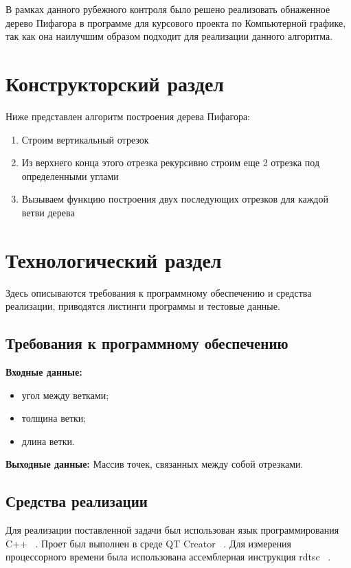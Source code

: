 \documentclass[a4paper,12pt]{article}
\begin{document}
	В рамках данного рубежного контроля было решено реализовать обнаженное дерево Пифагора в программе для курсового проекта по Компьютерной графике, так как она наилучшим образом подходит для реализации данного алгоритма.
	
	\section{Конструкторский раздел}
	
	Ниже представлен алгоритм построения дерева Пифагора:
	
	\begin{enumerate}
		\item Строим вертикальный отрезок
		\item Из верхнего конца этого отрезка рекурсивно строим еще 2 отрезка под определенными углами
		\item Вызываем функцию построения двух последующих отрезков для каждой ветви дерева
	\end{enumerate}
	
	\section{Технологический раздел}
	
	Здесь описываются требования к программному 
	обеспечению и средства реализации, приводятся листинги 
	программы и тестовые данные.
	
	\subsection{Требования к программному обеспечению}
	
	\begin{flushleft}
		\textbf{Входные данные:} 
		\begin{itemize}
			\item угол между ветками;
			\item толщина ветки;
			\item длина ветки.
		\end{itemize}
		\textbf{Выходные данные:} Массив точек, связанных между собой отрезками.
	\end{flushleft}

	\subsection{Средства реализации}
	
	Для реализации поставленной задачи был использован язык программирования C++ ~\cite{second}. Проет был выполнен в среде QT Creator ~\cite{third}. Для измерения процессорного времени была использована ассемблерная инструкция
	rdtsc ~\cite{fourth}.
	
\end{document}
